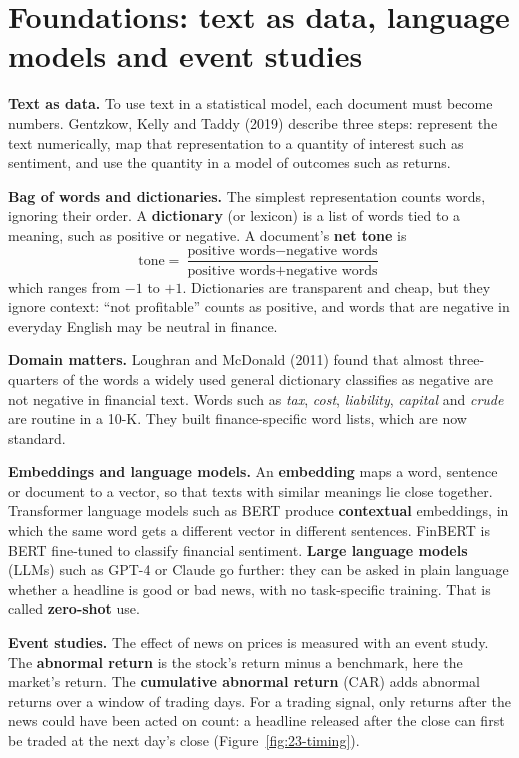 \section{Foundations: text as data, language models and event studies}
\label{sec:23-foundations}

\textbf{Text as data.} To use text in a statistical model, each document must become numbers. Gentzkow, Kelly and Taddy (2019) describe three steps: represent the text numerically, map that representation to a quantity of interest such as sentiment, and use the quantity in a model of outcomes such as returns.

\textbf{Bag of words and dictionaries.} The simplest representation counts words, ignoring their order. A \textbf{dictionary} (or lexicon) is a list of words tied to a meaning, such as positive or negative. A document's \textbf{net tone} is
\begin{equation}
  \text{tone} = \frac{\text{positive words} - \text{negative words}}{\text{positive words} + \text{negative words}}
  \label{eq:23-tone}
\end{equation}
which ranges from $-1$ to $+1$. Dictionaries are transparent and cheap, but they ignore context: ``not profitable'' counts as positive, and words that are negative in everyday English may be neutral in finance.

\textbf{Domain matters.} Loughran and McDonald (2011) found that almost three-quarters of the words a widely used general dictionary classifies as negative are not negative in financial text. Words such as \emph{tax}, \emph{cost}, \emph{liability}, \emph{capital} and \emph{crude} are routine in a 10-K. They built finance-specific word lists, which are now standard.

\textbf{Embeddings and language models.} An \textbf{embedding} maps a word, sentence or document to a vector, so that texts with similar meanings lie close together. Transformer language models such as BERT produce \textbf{contextual} embeddings, in which the same word gets a different vector in different sentences. FinBERT is BERT fine-tuned to classify financial sentiment. \textbf{Large language models} (LLMs) such as GPT-4 or Claude go further: they can be asked in plain language whether a headline is good or bad news, with no task-specific training. That is called \textbf{zero-shot} use.

\textbf{Event studies.} The effect of news on prices is measured with an event study. The \textbf{abnormal return} is the stock's return minus a benchmark, here the market's return. The \textbf{cumulative abnormal return} (CAR) adds abnormal returns over a window of trading days. For a trading signal, only returns after the news could have been acted on count: a headline released after the close can first be traded at the next day's close (Figure~\ref{fig:23-timing}).

